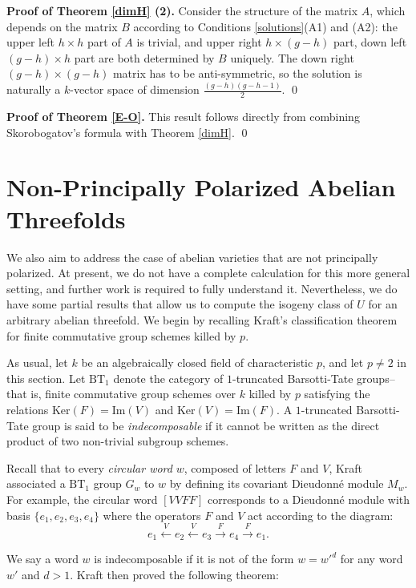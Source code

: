 \documentclass[a4paper,12pt,twoside]{report}
\newcommand{\Ker}{\mathrm{Ker}}
\newcommand{\BT}{\mathrm{BT}}
\newcommand{\IM}{\mathrm{Im}}
\begin{document}
\noindent\textbf{Proof of Theorem \ref{dimH} (2).}
Consider the structure of the matrix $A$, which depends on the matrix $B$ 
according to Conditions \ref{solutions}(A1) and (A2):
the upper left $h\times h$ part of $A$ is trivial, and upper right $h\times (g-h)$ part, 
down left $(g-h)\times h$ part are both determined by $B$ uniquely. 
The down right $(g-h)\times (g-h)$ matrix has to be anti-symmetric, 
so the solution is naturally a $k$-vector space of dimension $\frac{(g-h)(g-h-1)}{2}$. \qed 

\noindent\textbf{Proof of Theorem \ref{E-O}.}
This result follows directly from combining Skorobogatov’s formula with Theorem \ref{dimH}. \qed

\section{Non-Principally Polarized Abelian Threefolds}

We also aim to address the case of abelian varieties that are not principally polarized.
At present, we do not have a complete calculation for this more general setting, and further work is required to fully understand it.
Nevertheless, we do have some partial results that allow us to compute the isogeny class of $U$ for an arbitrary abelian threefold. 
We begin by recalling Kraft's classification theorem for finite commutative group schemes killed by $p$. 

As usual, let $k$ be an algebraically closed field of characteristic $p$, and let $p\neq 2$ in this section. 
Let $\BT_1$ denote the category of $1$-truncated Barsotti-Tate groups--that is, 
finite commutative group schemes over $k$ killed by $p$ satisfying the relations 
$\Ker(F)=\IM(V)$ and $\Ker(V)=\IM(F)$. 
A $1$-truncated Barsotti-Tate group is said to be \emph{indecomposable} if it cannot be written as the direct product of two non-trivial subgroup schemes.

Recall that to every \emph{circular word} $w$, composed of letters $F$ and $V$, 
Kraft associated a $\BT_1$ group $G_w$ to $w$ by defining its covariant Dieudonné module $M_w$. 
For example, the circular word $[VVFF]$ corresponds to a Dieudonn\'e module 
with basis $\{e_1,e_2,e_3,e_4\}$ where
the operators $F$ and $V$ act according to the diagram: 
\[e_1\xleftarrow{V}e_2 \xleftarrow{V} e_3 \xrightarrow{F}e_4 \xrightarrow{F} e_1. \]

We say a word $w$ is indecomposable if it is not of the form $w=w'^d$ for any word $w'$ and $d> 1$. 
Kraft then proved the following theorem: 
\end{document}
